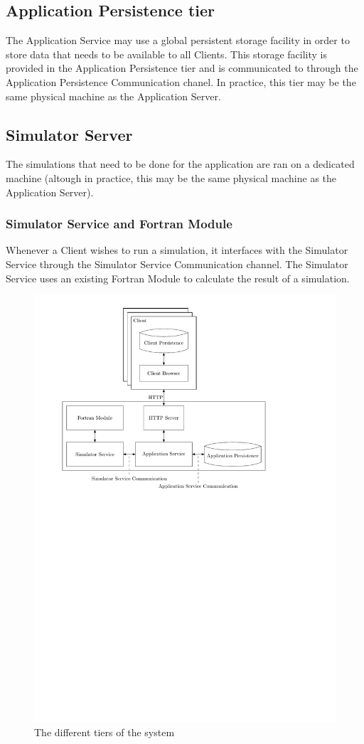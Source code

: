 \subsection{Application Persistence tier}
\label{sec:applicationpersistence}
The Application Service may use a global persistent storage facility in order to store data that needs to be available to all Clients. This storage facility is provided in the Application Persistence tier and is communicated to through the Application Persistence Communication chanel. In practice, this tier may be the same physical machine as the Application Server.

\subsection{Simulator Server}
\label{sec:simulatorserver}
The simulations that need to be done for the application are ran on a dedicated machine (altough in practice, this may be the same physical machine as the Application Server).

\subsubsection{Simulator Service and Fortran Module}
\label{sec:simulatorservice}
Whenever a Client wishes to run a simulation, it interfaces with the Simulator Service through the Simulator Service Communication channel. The Simulator Service uses an existing Fortran Module to calculate the result of a simulation.

\begin{figure}
	\centering
	\includegraphics[scale=0.8]{SoftwareTiers}
	\caption{The different tiers of the system}
	\label{fig:tierchannel}
\end{figure}
